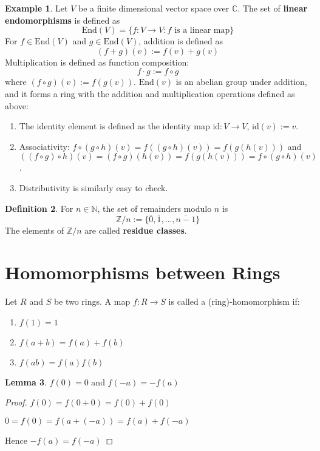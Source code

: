 \documentclass[12pt,a4paper]{article}
\theoremstyle{definition}
\newtheorem{definition}{Definition}[subsection]
\newtheorem{lemma}[definition]{Lemma}
\newtheorem{example}[definition]{Example}
\begin{document}
\begin{example}
	Let $V$ be a finite dimensional vector space over $\mathbb{C}$. The set of \textbf{linear endomorphisms} is defined as
	\[
		\text{End}(V) = \{ f: V \rightarrow V : f \text{ is a linear map} \}
	\]
	For $f \in \text{End}(V)$ and $g \in \text{End}(V)$, addition is defined as
	\[
		(f + g)(v) := f(v) + g(v)
	\]
	Multiplication is defined as function composition:
	\[
		f \cdot g := f \circ g
	\]
	where $(f \circ g)(v) := f(g(v))$. $\text{End}(v)$ is an abelian group under addition, and it forms a ring with the addition and multiplication operations defined as above:
	\begin{enumerate}
		\item The identity element is defined as the identity map $\text{id}: V \rightarrow V$, $\text{id}(v) := v$.
		\item Associativity: $f \circ (g \circ h) (v) = f((g \circ h)(v)) = f(g(h(v)))$ and $((f \circ g) \circ h) (v) = (f \circ g) (h(v)) = f(g(h(v))) = f \circ (g \circ h) (v)$.
		\item Distributivity is similarly easy to check.
	\end{enumerate}
\end{example}

\begin{definition}
	For $n \in \mathbb{N}$, the set of remainders modulo $n$ is
	\[
		\mathbb{Z} / n := \{ \bar{0}, \bar{1}, \dots, \overline{n - 1} \}
	\]
	The elements of $\mathbb{Z} / n$ are called \textbf{residue classes}.
\end{definition}

\section{Homomorphisms between Rings}

Let $R$ and $S$ be two rings. A map $f: R \rightarrow S$ is called a (ring)-homomorphism if:
\begin{enumerate}
	\item $f(1) = 1$
	\item $f(a + b) = f(a) + f(b)$
	\item $f(ab) = f(a)f(b)$
\end{enumerate}

\begin{lemma}
	$f(0) = 0$ and $f(-a) = -f(a)$
\end{lemma}

\begin{proof}
	$f(0) = f(0 + 0) = f(0) + f(0)$

	$0 = f(0) = f(a + (-a)) = f(a) + f(-a)$

	Hence $-f(a) = f(-a)$
\end{proof}
\end{document}
